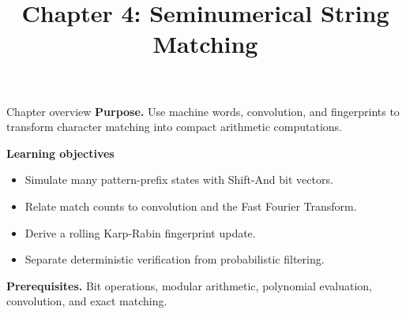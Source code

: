 \documentclass[11pt,letterpaper]{article}
\title{Chapter 4: Seminumerical String Matching}
\author{}
\date{}
\begin{document}
\maketitle

\begin{CornellOverviewBox}{Chapter overview}
\textbf{Purpose.} Use machine words, convolution, and fingerprints to transform character matching into compact arithmetic computations.

\textbf{Learning objectives}
\begin{itemize}
  \item Simulate many pattern-prefix states with Shift-And bit vectors.
  \item Relate match counts to convolution and the Fast Fourier Transform.
  \item Derive a rolling Karp-Rabin fingerprint update.
  \item Separate deterministic verification from probabilistic filtering.
\end{itemize}

\textbf{Prerequisites.} Bit operations, modular arithmetic, polynomial evaluation, convolution, and exact matching.
\end{CornellOverviewBox}
\end{document}
